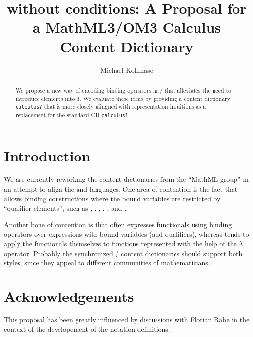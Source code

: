 \documentclass[12pt]{article}
\title{{\openmath3} without conditions: A Proposal for a MathML3/OM3 Calculus Content Dictionary}
\author{Michael Kohlhase}
\begin{document}
\maketitle
\begin{abstract}
  We propose a new way of encoding binding operators in {\openmath/\mathml} that
  alleviates the need to introduce {} elements into {\openmath}3. We
  evaluate these ideas by providing a content dictionary {\texttt{calculus?}} that is more
  closely alingned with {} representation intuitions as a replacement for the
  {\openmath} standard CD {\texttt{calculus1}}.
\end{abstract}

\section{Introduction}
We are currently reworking the {\openmath} content dictionaries from the ``MathML group''
in an attempt to align the {} and {} languages. One area of contention
is the fact that {\mathml} allows binding constructions where the bound variables are
restricted by ``qualifier elements'', such as {},
{}, {}, {}, {}, and
{}.

Another bone of contention is that {\mathml} often expresses functionals using binding
operators over expressions with bound variables (and qualifiers), whereas {\openmath}
tends to apply the functionals themselves to functions represented with the help of the
$\lambda$ operator. Probably the synchronized {}/{} content dictionaries
should support both styles, since they appeal to different communities of mathematicians.

\section{Acknowledgements}
This proposal has been greatly influenced by discussions with Florian Rabe in the context
of the developement of the {} notation definitions.

 

\end{document}
